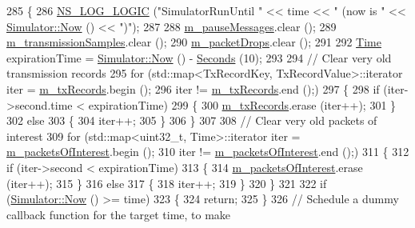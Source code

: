 \begin{DoxyCode}
285 \{
286   \hyperlink{group__logging_ga88acd260151caf2db9c0fc84997f45ce}{NS\_LOG\_LOGIC} (\textcolor{stringliteral}{"SimulatorRunUntil "} << time << \textcolor{stringliteral}{" (now is "} << 
      \hyperlink{classns3_1_1Simulator_ac3178fa975b419f7875e7105be122800}{Simulator::Now} () << \textcolor{stringliteral}{")"});
287 
288   \hyperlink{classns3_1_1PyViz_a9a1b3409dabe3cfd0a42b5e361971656}{m\_pauseMessages}.clear ();
289   \hyperlink{classns3_1_1PyViz_ab5e919d5d58fc6088fc94f5792a34225}{m\_transmissionSamples}.clear ();
290   \hyperlink{classns3_1_1PyViz_ae1e7568a80ebd9e74e2a5b6eb6c5c3c1}{m\_packetDrops}.clear ();
291 
292   \hyperlink{namespacens3_1_1TracedValueCallback_a7ffd3e7c142ffe7c8a1d2db9b8de38ec}{Time} expirationTime = \hyperlink{classns3_1_1Simulator_ac3178fa975b419f7875e7105be122800}{Simulator::Now} () - \hyperlink{group__timecivil_ga33c34b816f8ff6628e33d5c8e9713b9e}{Seconds} (10);
293 
294   \textcolor{comment}{// Clear very old transmission records}
295   \textcolor{keywordflow}{for} (std::map<TxRecordKey, TxRecordValue>::iterator iter = \hyperlink{classns3_1_1PyViz_ad051157796c1dee630ca8705ed89bbb6}{m\_txRecords}.begin ();
296        iter != \hyperlink{classns3_1_1PyViz_ad051157796c1dee630ca8705ed89bbb6}{m\_txRecords}.end ();)
297     \{
298       \textcolor{keywordflow}{if} (iter->second.time < expirationTime)
299         \{
300           \hyperlink{classns3_1_1PyViz_ad051157796c1dee630ca8705ed89bbb6}{m\_txRecords}.erase (iter++);
301         \}
302       \textcolor{keywordflow}{else}
303         \{
304           iter++;
305         \}
306     \}
307 
308   \textcolor{comment}{// Clear very old packets of interest}
309   \textcolor{keywordflow}{for} (std::map<uint32\_t, Time>::iterator iter = \hyperlink{classns3_1_1PyViz_af922cc7db7145889b2e518e568eac467}{m\_packetsOfInterest}.begin ();
310        iter != \hyperlink{classns3_1_1PyViz_af922cc7db7145889b2e518e568eac467}{m\_packetsOfInterest}.end ();)
311     \{
312       \textcolor{keywordflow}{if} (iter->second < expirationTime)
313         \{
314           \hyperlink{classns3_1_1PyViz_af922cc7db7145889b2e518e568eac467}{m\_packetsOfInterest}.erase (iter++);
315         \}
316       \textcolor{keywordflow}{else}
317         \{
318           iter++;
319         \}
320     \}
321 
322   \textcolor{keywordflow}{if} (\hyperlink{classns3_1_1Simulator_ac3178fa975b419f7875e7105be122800}{Simulator::Now} () >= time)
323     \{
324       \textcolor{keywordflow}{return};
325     \}
326   \textcolor{comment}{// Schedule a dummy callback function for the target time, to make}

\end{DoxyCode}
